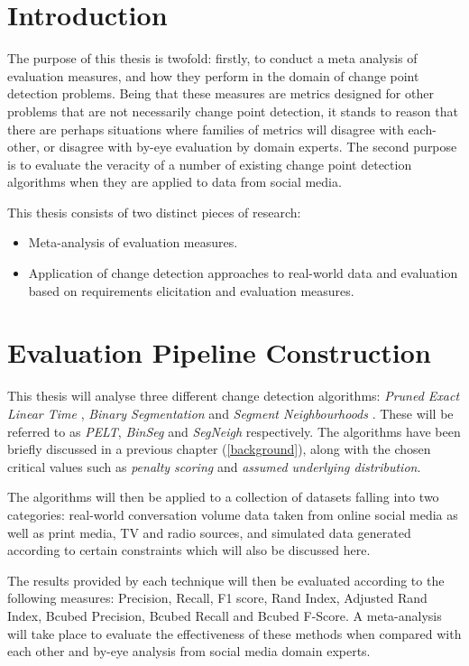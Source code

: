 \documentclass[../main.tex]{subfiles}
\begin{document}
\section{Introduction}

The purpose of this thesis is twofold: firstly, to conduct a meta analysis of evaluation measures, and how they perform in the domain of change point detection problems. Being that these measures are metrics designed for other problems that are not necessarily change point detection, it stands to reason that there are perhaps situations where families of metrics will disagree with each-other, or disagree with by-eye evaluation by domain experts. The second purpose is to evaluate the veracity of a number of existing change point detection algorithms when they are applied to data from social media.

This thesis consists of two distinct pieces of research:

\begin{itemize}
  \item Meta-analysis of evaluation measures.
  \item Application of change detection approaches to real-world data and evaluation based on requirements elicitation and evaluation measures.
\end{itemize}

\section{Evaluation Pipeline Construction}

This thesis will analyse three different change detection algorithms: \emph{Pruned Exact Linear Time} \cite{Killick2011a}, \emph{Binary Segmentation} \cite{Jackson2003} and \emph{Segment Neighbourhoods} \cite{Auger1989}. These will be referred to as \emph{PELT}, \emph{BinSeg} and \emph{SegNeigh} respectively. The algorithms have been briefly discussed in a previous chapter (\autoref{background}), along with the chosen critical values such as \emph{penalty scoring} and \emph{assumed underlying distribution}.

The algorithms will then be applied to a collection of datasets falling into two categories: real-world conversation volume data taken from online social media as well as print media, TV and radio sources, and simulated data generated according to certain constraints which will also be discussed here.

The results provided by each technique will then be evaluated according to the following measures: Precision, Recall, F1 score, Rand Index, Adjusted Rand Index, Bcubed Precision, Bcubed Recall and Bcubed F-Score. A meta-analysis will take place to evaluate the effectiveness of these methods when compared with each other and by-eye analysis from social media domain experts.
\end{document}
